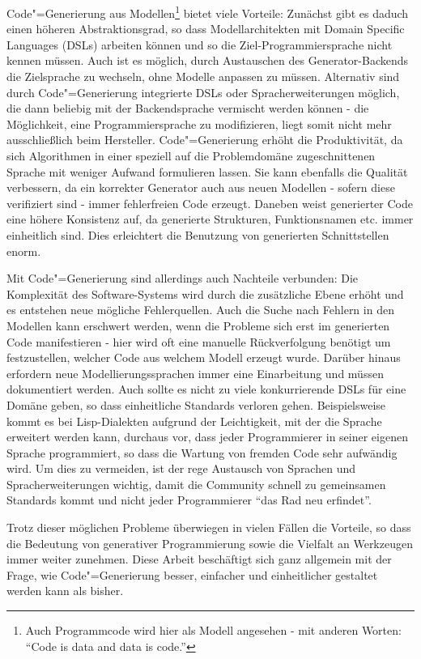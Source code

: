 \documentclass[11pt, a4paper, bibgerm]{scrbook}
\newcommand{\cgen}{Code"=Generierung}
\begin{document}
\cgen{} aus Modellen\footnote{Auch Programmcode wird hier als Modell
  angesehen - mit anderen Worten: "`Code is data and data is code."'}
bietet viele Vorteile: Zunächst gibt es daduch einen höheren
Abstraktionsgrad, so dass Modellarchitekten mit Domain Specific
Languages (DSLs) arbeiten können und so die Ziel-Programmiersprache
nicht kennen müssen. Auch ist es möglich, durch Austauschen des
Generator-Backends die Zielsprache zu wechseln, ohne Modelle anpassen zu
müssen. Alternativ sind durch \cgen{} integrierte DSLs oder
Spracherweiterungen möglich, die dann beliebig mit der Backendsprache
vermischt werden können - die Möglichkeit, eine Programmiersprache zu
modifizieren, liegt somit nicht mehr ausschließlich beim
Hersteller. \cgen{} erhöht die Produktivität, da sich Algorithmen in
einer speziell auf die Problemdomäne zugeschnittenen Sprache mit weniger
Aufwand formulieren lassen. Sie kann ebenfalls die Qualität verbessern, da ein
korrekter Generator auch aus neuen Modellen - sofern diese verifiziert
sind - immer fehlerfreien Code erzeugt. Daneben weist generierter Code eine
höhere Konsistenz auf, da generierte Strukturen, Funktionsnamen
etc. immer einheitlich sind. Dies erleichtert die Benutzung von
generierten Schnittstellen enorm.

Mit \cgen{} sind allerdings auch Nachteile verbunden: Die Komplexität des
Software-Systems wird durch die zusätzliche Ebene erhöht und es
entstehen neue mögliche Fehlerquellen. Auch die Suche nach Fehlern in
den Modellen kann erschwert werden, wenn die Probleme sich erst im
generierten Code manifestieren - hier wird oft eine manuelle
Rückverfolgung benötigt um festzustellen, welcher Code aus welchem
Modell erzeugt wurde. Darüber hinaus erfordern neue
Modellierungssprachen immer eine Einarbeitung und müssen dokumentiert
werden. Auch sollte es nicht zu viele konkurrierende DSLs für eine
Domäne geben, so dass einheitliche Standards verloren
gehen. Beispielsweise kommt es bei Lisp\cite{Lisp}-Dialekten aufgrund
der Leichtigkeit, mit der die Sprache erweitert werden kann, durchaus
vor, dass jeder Programmierer in seiner eigenen Sprache programmiert, so
dass die Wartung von fremden Code sehr aufwändig wird. Um dies zu
vermeiden, ist der rege Austausch von Sprachen und Spracherweiterungen
wichtig, damit die Community schnell zu gemeinsamen Standards kommt
und nicht jeder Programmierer "`das Rad neu erfindet"'.

Trotz dieser möglichen Probleme überwiegen in vielen Fällen die
Vorteile, so dass die Bedeutung von generativer Programmierung sowie die
Vielfalt an Werkzeugen immer weiter zunehmen. Diese Arbeit beschäftigt
sich ganz allgemein mit der Frage, wie \cgen{} besser, einfacher und
einheitlicher gestaltet werden kann als bisher.
\end{document}

